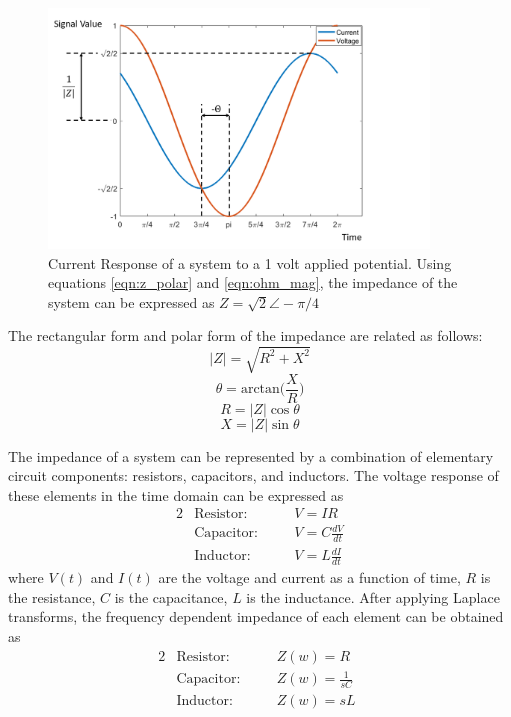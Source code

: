  \begin{figure}[ht]
    \centering
    \includegraphics[width=0.9\textwidth]{images/ac_signal.png}
    \caption[Current Response of a system to an applied voltage]{Current Response of a system to a 1 volt applied potential. Using equations \ref{eqn:z_polar} and \ref{eqn:ohm_mag}, the impedance of the system can be expressed as $Z=\sqrt{2}\angle -\pi/4$} 
    \label{fig:ac_signal}
 \end{figure}
 
 \par The rectangular form and polar form of the impedance are related as follows:
 \begin{equation}
     |Z| = \sqrt{R^2 + X^2}
 \end{equation}
 \begin{equation}
    \theta = \text{arctan}\Big(\frac{X}{R}\Big)
 \end{equation}
 \begin{equation}
    R = |Z|\cos\theta
 \end{equation}
 \begin{equation}
     X = |Z|\sin\theta
 \end{equation}
 
 \par The impedance of a system can be represented by a combination of elementary circuit components: resistors, capacitors, and inductors. The voltage response of these elements in the time domain can be expressed as
 \begin{alignat}{2}
    &\text{Resistor:} \quad  &&V = IR \label{eqn:ohms_law}\\
    &\text{Capacitor:} \quad &&V = C \frac{dV}{dt}\\
    &\text{Inductor:} \quad  &&V = L \frac{dI}{dt}
 \end{alignat}
 \noindent where $V(t)$ and $I(t)$ are the voltage and current as a function of time, $R$ is the resistance, $C$ is the capacitance, $L$ is the inductance. After applying Laplace transforms, the frequency dependent impedance of each element can be obtained as
  \begin{alignat}{2}
    &\text{Resistor:} \quad  &&Z(w) = R \;\;\;\\
    &\text{Capacitor:} \quad &&Z(w) = \frac{1}{sC}\\
    &\text{Inductor:} \quad  &&Z(w) = sL
 \end{alignat}
 
